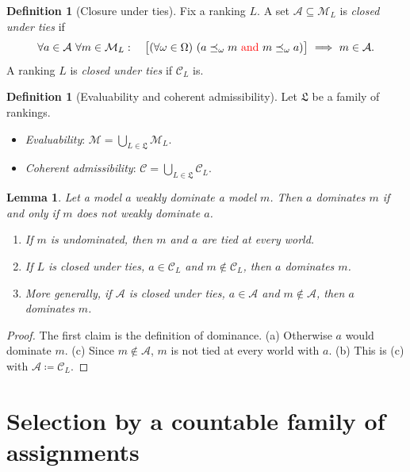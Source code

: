 \documentclass[11pt]{article}
\newtheorem{lemma}[theorem]{Lemma}
\theoremstyle{definition}
\newtheorem{definition}[theorem]{Definition}
\theoremstyle{remark}
\newcommand{\M}{\mathcal M}
\newcommand{\C}{\mathcal C}
\newcommand{\Lf}{\mathfrak L}
\begin{document}
\begin{definition}[Closure under ties]\label{def:tie-closure}
Fix a ranking $L$. A set $\mathcal A\subseteq\M_L$ is \emph{closed under ties} if
\[
\forall a\in\mathcal A\ \forall m\in\M_L:\quad
\bigl[(\forall\omega\in\Omega)\ (a\preceq_\omega m\ \textcolor{red}{\text{and}}\ m\preceq_\omega a)\bigr]\ \Longrightarrow\ m\in\mathcal A.
\] A ranking $L$ is \emph{closed under ties} if $\C_L$ is.
\end{definition}

\begin{definition}[Evaluability and coherent admissibility]\label{def:family-assumptions}
Let $\Lf$ be a family of rankings.
\begin{itemize}[leftmargin=*]
\item \emph{Evaluability}: $\M=\bigcup_{L\in\Lf}\M_L$.
\item \emph{Coherent admissibility}: $\C=\bigcup_{L\in\Lf}\C_L$.
\end{itemize}
\end{definition}

\begin{lemma}\label{lem:ties}
Let a model $a$ weakly dominate a model $m$. Then $a$ dominates $m$ if and only if $m$ does not weakly dominate $a$.
\begin{enumerate}[label=(\alph*)]
\item If $m$ is undominated, then $m$ and $a$ are tied at every world.
\item If $L$ is closed under ties, $a\in\C_L$ and $m\notin\C_L$, then $a$ dominates $m$.
\item More generally, if $\mathcal A$ is closed under ties, $a\in\mathcal A$ and $m\notin\mathcal A$, then $a$ dominates $m$.
\end{enumerate}
\end{lemma}
\begin{proof}
The first claim is the definition of dominance. (a) Otherwise $a$ would dominate $m$. (c) Since $m\notin\mathcal A$, $m$ is not tied at every world with $a$. (b) This is (c) with $\mathcal A\coloneqq\C_L$.
\end{proof}

\section{Selection by a countable family of assignments}\label{sec:general}
\end{document}
